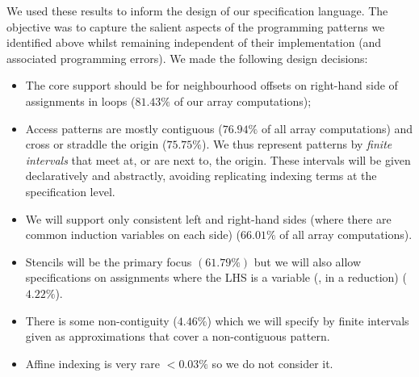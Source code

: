 \noindent
We used these results to inform the design of our specification
language. The objective was to capture the salient aspects of the
programming patterns we identified above whilst remaining independent
of their implementation (and associated programming errors). We made the following design decisions:
%
\begin{itemize}[leftmargin=1.5em]
\item The core support should be for neighbourhood offsets on
  right-hand side of assignments in loops ($81.43\%$ of our array
  computations);

\item Access patterns are mostly contiguous ($76.94\%$ of all array
  computations) and cross or straddle the origin ($75.75\%$). We thus
  represent patterns by \emph{finite intervals} that meet at, or
  are next to, the origin.  These intervals will be given
  declaratively and abstractly, avoiding replicating indexing terms at
  the specification level.

\item We will support only consistent left and right-hand sides (where
  there are common induction variables on each side) ($66.01\%$ of all
  array computations).

\item Stencils will be the primary focus $(61.79\%)$ but we will also
  allow specifications on assignments where the LHS is a variable
  (\eg{}, in a reduction) ($4.22\%$).

\item There is some non-contiguity ($4.46\%$) which we will specify by
  finite intervals given as approximations that cover a non-contiguous
  pattern.

\item Affine indexing is very rare $<0.03\%$ so we do not consider it.
\end{itemize}